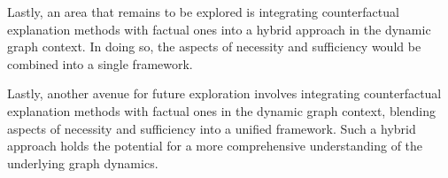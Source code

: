 Lastly, an area that remains to be explored is integrating counterfactual explanation methods with factual ones into a hybrid approach in the dynamic graph context. In doing so, the aspects of necessity and sufficiency would be combined into a single framework.

Lastly, another avenue for future exploration involves integrating counterfactual explanation methods with factual ones in the dynamic graph context, blending aspects of necessity and sufficiency into a unified framework. Such a hybrid approach holds the potential for a more comprehensive understanding of the underlying graph dynamics.



